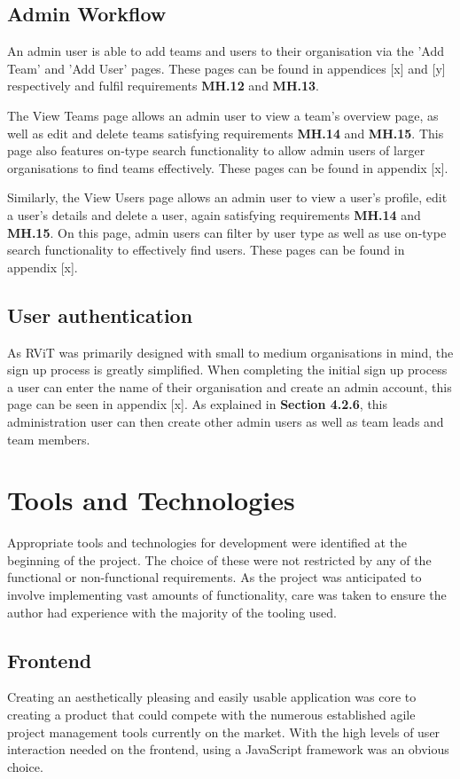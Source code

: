 \documentclass[l4proj.tex]{subfiles}
\begin{document}
\subsection{Admin Workflow}
An admin user is able to add teams and users to their organisation via the 'Add Team' and 'Add User' pages. These pages can be found in appendices [x] and [y] respectively and fulfil requirements \textbf{MH.12} and \textbf{MH.13}.

The View Teams page allows an admin user to view a team's overview page, as well as edit and delete teams satisfying requirements \textbf{MH.14} and \textbf{MH.15}. This page also features on-type search functionality to allow admin users of larger organisations to find teams effectively. These pages can be found in appendix [x].

Similarly, the View Users page allows an admin user to view a user's profile, edit a user's details and delete a user, again satisfying requirements \textbf{MH.14} and \textbf{MH.15}. On this page, admin users can filter by user type as well as use on-type search functionality to effectively find users. These pages can be found in appendix [x].


\subsection{User authentication}
As RViT was primarily designed with small to medium organisations in mind, the sign up process is greatly simplified. When completing the initial sign up process a user can enter the name of their organisation and create an admin account, this page can be seen in appendix [x]. As explained in \textbf{Section 4.2.6}, this administration user can then create other admin users as well as team leads and team members. 

\section{Tools and Technologies}
Appropriate tools and technologies for development were identified at the beginning of the project. The choice of these were not restricted by any of the functional or non-functional requirements. As the project was anticipated to involve implementing vast amounts of functionality, care was taken to ensure the author had experience with the majority of the tooling used. 

\subsection{Frontend}
Creating an aesthetically pleasing and easily usable application was core to creating a product that could compete with the numerous established agile project management tools currently on the market. With the high levels of user interaction needed on the frontend, using a JavaScript framework was an obvious choice. 
\end{document}
